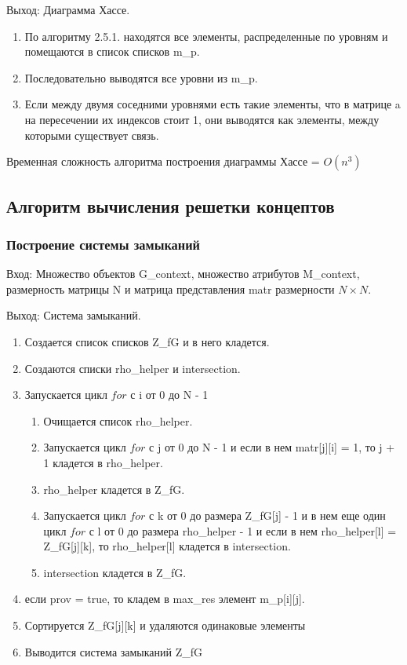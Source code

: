 \documentclass[bachelor, och, labwork]{shiza}
\begin{document}
	$\textit{Выход:}$  Диаграмма Хассе.
	
	\begin{enumerate} 
		\item По алгоритму 2.5.1. находятся все элементы, распределенные по уровням и помещаются в список списков m\_p.
		\item Последовательно выводятся все уровни из m\_p.
		\item Если между двумя соседними уровнями есть такие элементы, что в матрице a на пересечении их индексов стоит 1, они выводятся как элементы, между которыми существует связь.
	\end{enumerate} 
	
		Временная сложность алгоритма построения диаграммы Хассе = $O(n^3)$		
	
	\subsection{Алгоритм вычисления решетки концептов}		
	
		\subsubsection{Построение системы замыканий}		
	
	$\textit{Вход:}$ Множество объектов G\_context, множество атрибутов M\_context, размерность матрицы N и матрица представления matr размерности $N \times N$.
	
	$\textit{Выход:}$  Система замыканий.
		
	\begin{enumerate} 
		\item Создается список списков Z\_fG и в него кладется.
		\item Создаются списки rho\_helper и intersection.
		\item Запускается цикл $for$ с i от 0 до N - 1
		\begin{enumerate} 
			\item Очищается список rho\_helper.
			\item Запускается цикл $for$ с j от 0 до N - 1 и если в нем matr[j][i] = 1, то j + 1 кладется в rho\_helper.
			\item rho\_helper кладется в Z\_fG.
			\item Запускается цикл $for$ с k от 0 до размера Z\_fG[j] - 1 и в нем еще один цикл $for$ с l от 0 до размера rho\_helper - 1 и если в нем rho\_helper[l] = Z\_fG[j][k], то rho\_helper[l] кладется в intersection.
			\item intersection кладется в Z\_fG.
		\end{enumerate}
		\item если prov = true, то кладем в max\_res элемент m\_p[i][j].
		\item Сортируется Z\_fG[j][k] и удаляются одинаковые элементы
		\item Выводится система замыканий Z\_fG
	\end{enumerate} 
	
\end{document}
